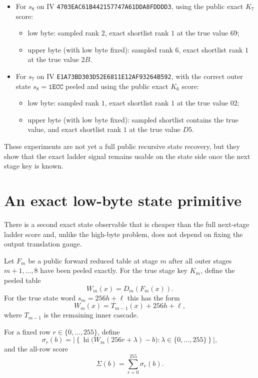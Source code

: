 \documentclass[11pt]{article}
\begin{document}
\begin{itemize}
\item For $s_8$ on IV \texttt{4703EAC61B442157747A61DDA8FDDDD3}, using the public exact $K_7$ score:
  \begin{itemize}
  \item low byte: sampled rank $2$, exact shortlist rank $1$ at the true value $69$;
  \item upper byte (with low byte fixed): sampled rank $6$, exact shortlist rank $1$ at the true value $2B$.
  \end{itemize}
\item For $s_7$ on IV \texttt{E1A73BD303D52E6811E12AF93264B592}, with the correct outer state $s_8=\texttt{1ECC}$ peeled and using the public exact $K_6$ score:
  \begin{itemize}
  \item low byte: sampled rank $1$, exact shortlist rank $1$ at the true value $02$;
  \item upper byte (with low byte fixed): sampled shortlist contains the true value, and exact shortlist rank $1$ at the true value $D5$.
  \end{itemize}
\end{itemize}

These experiments are not yet a full public recursive state recovery, but they show that the exact ladder signal remains usable on the state side once the next stage key is known.

\section{An exact low-byte state primitive}
There is a second exact state observable that is cheaper than the full next-stage ladder score and, unlike the high-byte problem, does not depend on fixing the output translation gauge.

Let $F_m$ be a public forward reduced table at stage $m$ after all outer stages $m+1,\dots,8$ have been peeled exactly. For the true stage key $K_m$, define the peeled table
\[
W_m(x)=D_m(F_m(x)).
\]
For the true state word $s_m = 256h + \ell$ this has the form
\[
W_m(x)=T_{m-1}(x)+256h+\ell,
\]
where $T_{m-1}$ is the remaining inner cascade.

For a fixed row $r\in\{0,\dots,255\}$, define
\[
\sigma_r(b)=\left|\left\{\operatorname{hi}\bigl(W_m(256r+\lambda)-b\bigr): \lambda\in\{0,\dots,255\}\right\}\right|,
\]
and the all-row score
\[
\Sigma(b)=\sum_{r=0}^{255}\sigma_r(b).
\]
\end{document}
